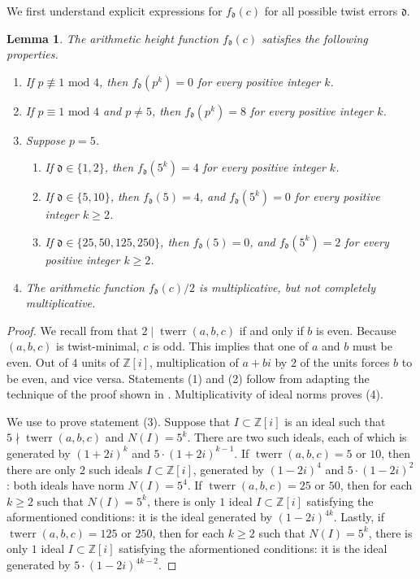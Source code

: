 \documentclass[12pt]{amsart}
\newcounter{counter}[section] %
\numberwithin{equation}{section} %
\newtheorem{lemma}[counter]{Lemma}
\theoremstyle{definition} \newtheorem{definition}[counter]{Definition}
\theoremstyle{remark} \newtheorem{nonexam}[counter]{Non-example}
\DeclareMathOperator{\twerr}{twerr} %
\begin{document}
We first understand explicit expressions for $f_{\mathfrak{d}}(c)$ for all possible twist errors $\mathfrak{d}$.
\begin{lemma} \label{lemma:arithmetic-height-fun-f-mathfrakd}
    The arithmetic height function $f_{\mathfrak{d}}(c)$ satisfies the following properties.
    \begin{enumerate}
        \item If $p \not\equiv 1 \text{ mod } 4$, then $f_{\mathfrak{d}}(p^k) = 0$ for every positive integer $k$.
        \item If $p \equiv 1 \text{ mod } 4$ and $p \neq 5$, then $f_{\mathfrak{d}}(p^k) = 8$ for every positive integer $k$.
        \item Suppose $p = 5$. 
        \begin{enumerate}
            \item If $\mathfrak{d} \in \{1, 2\}$, then $f_{\mathfrak{d}}(5^k) = 4$ for every positive integer $k$.
            \item If $\mathfrak{d} \in \{5,10\}$, then $f_{\mathfrak{d}}(5) = 4$, and $f_{\mathfrak{d}}(5^k) = 0$ for every positive integer $k \geq 2$.
            \item If $\mathfrak{d} \in \{25,50,125,250\}$, then $f_{\mathfrak{d}}(5) = 0$, and $f_{\mathfrak{d}}(5^k) = 2$ for every positive integer $k \geq 2$.
        \end{enumerate}
        \item The arithmetic function $f_{\mathfrak{d}}(c)/2$ is multiplicative, but not completely multiplicative.
    \end{enumerate}
\end{lemma}
\begin{proof}
    We recall from  that $2 \mid \twerr(a,b,c)$ if and only if $b$ is even. Because $(a,b,c)$ is twist-minimal, $c$ is odd. This implies that one of $a$ and $b$ must be even. Out of $4$ units of $\mathbb{Z}[i]$, multiplication of $a+bi$ by $2$ of the units forces $b$ to be even, and vice versa. Statements (1) and (2) follow from adapting the technique of the proof shown in . Multiplicativity of ideal norms proves (4).

    We use  to prove statement (3). Suppose that $I \subset \mathbb{Z}[i]$ is an ideal such that $5 \nmid \twerr(a,b,c)$ and $N(I) = 5^k$. There are two such ideals, each of which is generated by $(1+2i)^k$ and $5 \cdot (1+2i)^{k-1}$. If $\twerr(a,b,c) = 5$ or $10$, then there are only $2$ such ideals $I \subset \mathbb{Z}[i]$, generated by $(1-2i)^4$ and $5 \cdot (1-2i)^2$: both ideals have norm $N(I) = 5^4$. If $\twerr(a,b,c) = 25$ or $50$, then for each $k \geq 2$ such that $N(I)  = 5^k$, there is only $1$ ideal $I \subset \mathbb{Z}[i]$ satisfying the aformentioned conditions: it is the ideal generated by $(1-2i)^{4k}$. Lastly, if $\twerr(a,b,c) = 125$ or $250$, then for each $k \geq 2$ such that $N(I)  = 5^k$, there is only $1$ ideal $I \subset \mathbb{Z}[i]$ satisfying the aformentioned conditions: it is the ideal generated by $5 \cdot (1-2i)^{4k-2}$.
\end{proof}
\end{document}
